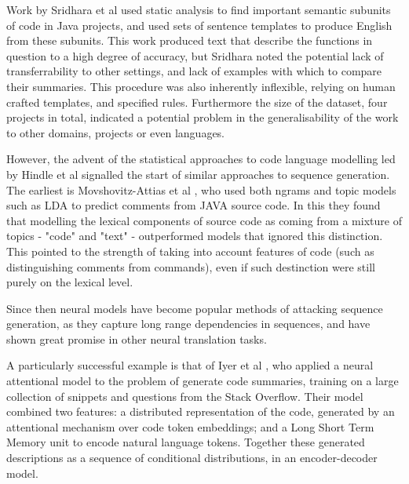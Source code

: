 Work by Sridhara et al \cite{sridhara_[not_2010}  used static analysis to find important semantic subunits of code in Java projects, and used sets of sentence templates to produce English from these subunits.
This work produced text that describe the functions in question to a high degree of accuracy, but Sridhara noted the potential lack of transferrability to other settings, and lack of examples with which to compare their summaries.  
This procedure was also inherently inflexible, relying on human crafted templates, and specified rules. Furthermore the size of the dataset, four projects in total, indicated a potential problem in the generalisability of the work to other domains, projects or even languages.

However, the advent of the statistical approaches to code language modelling led by Hindle et al \cite{hindle_naturalness_nodate} signalled the start of similar approaches to sequence generation. The earliest is Movshovitz-Attias et al \cite{movshovitz-attias_natural_nodate}, who used both ngrams and topic models such as LDA to predict comments from JAVA source code. In this they found that modelling the lexical components of source code as coming from a mixture of topics - "code" and "text" - outperformed models that ignored this distinction.  This pointed to the strength of taking into account features of code (such as distinguishing comments from commands), even if such destinction were still purely on the lexical level.

Since then neural models have become popular methods of attacking sequence generation, as they capture long range dependencies in sequences, and have shown great promise in other neural translation tasks.

A particularly successful example is that of Iyer et al \cite{iyer_summarizing_2016}, who applied a neural attentional model to the problem of generate code summaries, training on a large collection of snippets and questions from the Stack Overflow.   Their model combined two features: a distributed representation of the code, generated by an attentional mechanism \cite{luong_effective_2015} over code token embeddings; and a Long Short Term Memory unit \cite{hochreiter_long_1997} to encode natural language tokens. Together these generated descriptions as a sequence of conditional distributions, in an encoder-decoder model. 

